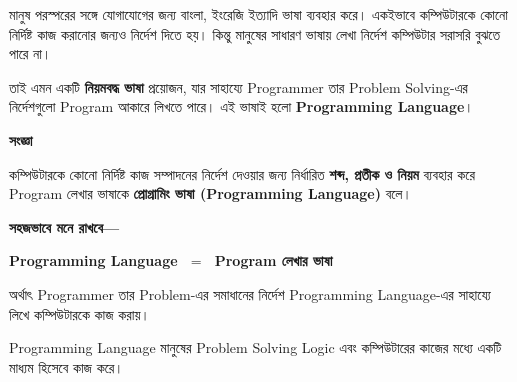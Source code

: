 
মানুষ পরস্পরের সঙ্গে যোগাযোগের জন্য বাংলা, ইংরেজি ইত্যাদি ভাষা
ব্যবহার করে। একইভাবে কম্পিউটারকে কোনো নির্দিষ্ট কাজ করানোর জন্যও
নির্দেশ দিতে হয়। কিন্তু মানুষের সাধারণ ভাষায় লেখা নির্দেশ
কম্পিউটার সরাসরি বুঝতে পারে না।

তাই এমন একটি \textbf{নিয়মবদ্ধ ভাষা} প্রয়োজন, যার সাহায্যে
Programmer তার Problem Solving-এর নির্দেশগুলো Program আকারে
লিখতে পারে। এই ভাষাই হলো \textbf{Programming Language}।


\begin{definitionbox}

\textbf{\color{darkTeal}সংজ্ঞা}

কম্পিউটারকে কোনো নির্দিষ্ট কাজ সম্পাদনের নির্দেশ দেওয়ার জন্য
নির্ধারিত \textbf{শব্দ, প্রতীক ও নিয়ম} ব্যবহার করে Program লেখার
ভাষাকে \textbf{প্রোগ্রামিং ভাষা (Programming Language)} বলে।

\end{definitionbox}

\textbf{সহজভাবে মনে রাখবে—}

\begin{center}

\textbf{
Programming Language
\(\;=\;\)
Program লেখার ভাষা
}

\end{center}

অর্থাৎ Programmer তার Problem-এর সমাধানের নির্দেশ
Programming Language-এর সাহায্যে লিখে কম্পিউটারকে কাজ করায়।


Programming Language মানুষের Problem Solving Logic এবং
কম্পিউটারের কাজের মধ্যে একটি মাধ্যম হিসেবে কাজ করে।

\begin{center}


\end{center}

